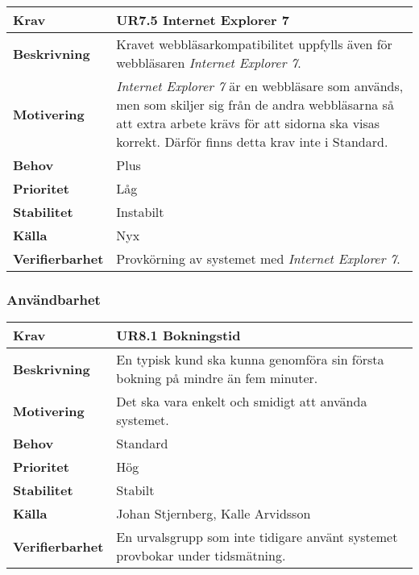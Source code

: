 \documentclass[a4paper, twoside, 11pt, titlepage]{article}
\begin{document}
		\begin{tabular} { p{2.6cm} p{12.5cm} }
			\hline
			\sffamily\textbf{Krav} & \sffamily\textbf{UR7.5 Internet Explorer 7 } \\
			\hline
			\sffamily\textbf{Beskrivning} & Kravet webbläsarkompatibilitet uppfylls även för webbläsaren \emph{Internet Explorer 7}.  \\
			\hline
			\sffamily\textbf{Motivering} &  \emph{Internet Explorer 7} är en webbläsare som används, men som skiljer sig från de andra webbläsarna så att extra arbete krävs för att sidorna ska visas korrekt. Därför finns detta krav inte i Standard.  \\
			\hline
			\sffamily\textbf{Behov} & Plus  \\
			\hline
			\sffamily\textbf{Prioritet} & Låg  \\
			\hline
			\sffamily\textbf{Stabilitet} & Instabilt  \\
			\hline
			\sffamily\textbf{Källa} & Nyx  \\
			\hline
			\sffamily\textbf{Verifierbarhet} & Provkörning av systemet med \emph{Internet Explorer 7}.  \\
			\hline
		\end{tabular}


		\subsubsection{Användbarhet}


		\begin{tabular} { p{2.6cm} p{12.5cm} }
			\hline
			\sffamily\textbf{Krav} & \sffamily\textbf{UR8.1 Bokningstid } \\
			\hline
			\sffamily\textbf{Beskrivning} & En typisk kund ska kunna genomföra sin första bokning på mindre än fem minuter.  \\
			\hline
			\sffamily\textbf{Motivering} & Det ska vara enkelt och smidigt att använda systemet.  \\
			\hline
			\sffamily\textbf{Behov} & Standard  \\
			\hline
			\sffamily\textbf{Prioritet} & Hög  \\
			\hline
			\sffamily\textbf{Stabilitet} & Stabilt  \\
			\hline
			\sffamily\textbf{Källa} & Johan Stjernberg, Kalle Arvidsson  \\
			\hline
			\sffamily\textbf{Verifierbarhet} & En urvalsgrupp som inte tidigare använt systemet provbokar under tidsmätning.  \\
			\hline
		\end{tabular}
		\vspace{6mm}
\end{document}
